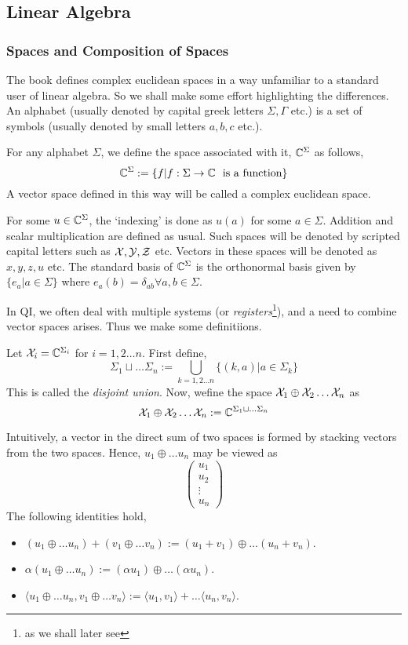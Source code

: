 \subsection{Linear Algebra}
\subsubsection{Spaces and Composition of Spaces}
The book defines complex euclidean spaces in a way unfamiliar to a standard user of linear algebra. So we shall make some effort highlighting the differences. An alphabet (usually denoted by capital greek letters $\Sigma,\Gamma$ etc.) is a set of symbols (usually denoted by small letters $a,b,c $ etc.). 
\begin{definition}
For any alphabet $\Sigma$, we define the space associated with it, $\mathbb{C}^{\Sigma}$ as follows,
\[\mathbb{C}^{\Sigma} := \{f|f:\Sigma\to\mathbb{C}\ \text{ is a function}\}\]
A vector space defined in this way will be called a complex euclidean space. 
\end{definition}\noindent
For some $u \in \mathbb{C}^{\Sigma}$, the `indexing' is done as $u(a)$ for some $a\in\Sigma$. Addition and scalar multiplication are defined as usual. Such spaces will be denoted by scripted capital letters such as $\mathcal{X},\mathcal{Y},\mathcal{Z}$ etc. Vectors in these spaces will be denoted as $x,y,z,u$ etc. The standard basis of $\mathbb{C}^{\Sigma}$ is the orthonormal basis given by $\{e_a | a \in \Sigma\}$ where $e_a(b) = \delta_{ab} \forall a,b\in\Sigma$.


\noindent In QI, we often deal with multiple systems (or \textit{registers}\footnote{as we shall later see}), and a need to combine vector spaces arises. Thus we make some definitiions.
\begin{definition}
Let $\mathcal{X}_i = \mathbb{C}^{\Sigma_i}$ for $i = 1,2 \dots n$. First define,
\[\Sigma_1\sqcup\dots\Sigma_n := \bigcup_{k = 1,2\dots n}\{(k,a)|a\in\Sigma_k\}\]
This is called the \textit{disjoint union}. Now, wefine the space $\mathcal{X}_1\oplus\mathcal{X}_2\dots\mathcal{X}_n$ as
\[\mathcal{X}_1\oplus\mathcal{X}_2\dots\mathcal{X}_n := \mathbb{C}^{\Sigma_1\sqcup\dots\Sigma_n}\]
\end{definition}\noindent 
Intuitively, a vector in the direct sum of two spaces is formed by stacking vectors from the two spaces. Hence, $u_1\oplus \dots u_n$ may be viewed as 
\[\begin{pmatrix}u_1\\u_2 \\ \vdots \\ u_n
\end{pmatrix}\]
The following identities hold,
\begin{itemize}
    \item $(u_1\oplus\dots u_n) + (v_1\oplus\dots v_n) := (u_1+v_1) \oplus \dots (u_n+v_n)$.
    \item $\alpha(u_1\oplus\dots u_n) := (\alpha u_1)\oplus\dots (\alpha u_n)$.
    \item $\langle u_1\oplus\dots u_n,v_1\oplus\dots v_n\rangle := \langle u_1,v_1\rangle + \dots \langle u_n,v_n\rangle$.
\end{itemize}

